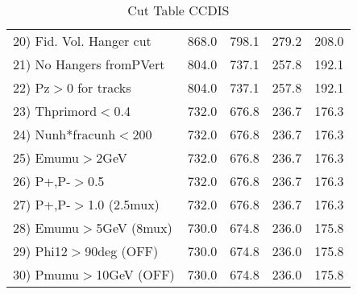 \begin{table}[h!]
\begin{tabular}{||l||r|r|r|r||}
 20) Fid. Vol. Hanger cut &       868.0 &       798.1 &       279.2 &       208.0 \\
 21) No Hangers fromPVert &       804.0 &       737.1 &       257.8 &       192.1 \\
 22) Pz$>$0 for tracks    &       804.0 &       737.1 &       257.8 &       192.1 \\
 23) Thprimord$<$0.4      &       732.0 &       676.8 &       236.7 &       176.3 \\
 24) Nunh*fracunh$<$200   &       732.0 &       676.8 &       236.7 &       176.3 \\
 25) Emumu$>$2GeV         &       732.0 &       676.8 &       236.7 &       176.3 \\
 26) P+,P-$>$0.5          &       732.0 &       676.8 &       236.7 &       176.3 \\
 27) P+,P-$>$1.0 (2.5mux) &       732.0 &       676.8 &       236.7 &       176.3 \\
 28) Emumu$>$5GeV  (8mux) &       730.0 &       674.8 &       236.0 &       175.8 \\
 29) Phi12$>$90deg  (OFF) &       730.0 &       674.8 &       236.0 &       175.8 \\
 30) Pmumu$>$10GeV  (OFF) &       730.0 &       674.8 &       236.0 &       175.8 \\
 \hline
 \hline
 \end{tabular}
 \caption{Cut Table  CCDIS  }
 \label{tab-cut_ccdis}
 \end{table}
